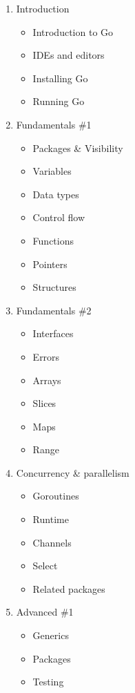 \documentclass[
  digital,
  color,
  oneside,
  nosansbold,
  nocolorbold,
  lof,
  lot,
]{fithesis4}
\begin{document}
\begin{enumerate}
    \item Introduction
    \begin{itemize}
        \item Introduction to Go
        \item IDEs and editors
        \item Installing Go
        \item Running Go
    \end{itemize}
    \item Fundamentals \#1
    \begin{itemize}
        \item Packages \& Visibility
        \item Variables
        \item Data types
        \item Control flow
        \item Functions
        \item Pointers
        \item Structures
    \end{itemize}
    \item Fundamentals \#2
    \begin{itemize}
        \item Interfaces
        \item Errors
        \item Arrays
        \item Slices
        \item Maps
        \item Range
    \end{itemize}
    \item Concurrency \& parallelism
    \begin{itemize}
        \item Goroutines
        \item Runtime
        \item Channels
        \item Select
        \item Related packages
    \end{itemize}
    \item Advanced \#1
    \begin{itemize}
        \item Generics
        \item Packages
        \item Testing
    \end{itemize}

\end{enumerate}
\end{document}
